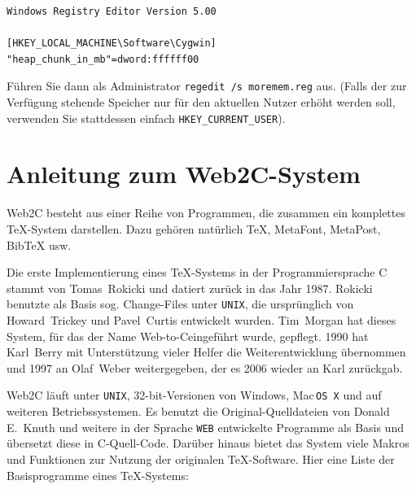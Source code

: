 \documentclass[12pt,ngerman,a4paper,fullparskip]{report}
\newcommand{\acro}[1]{\texttt{#1}}
\newcommand{\code}[1]{\texttt{#1}}
\def\MP{MetaPost}
\def\MF{MetaFont}
\def\BibTeX{Bib\TeX}
\providecommand*{\MacOSX}{Mac\,\acro{OS\,X}\xspace}
\begin{document}
\begin{verbatim}
Windows Registry Editor Version 5.00

[HKEY_LOCAL_MACHINE\Software\Cygwin]
"heap_chunk_in_mb"=dword:ffffff00
\end{verbatim}

Führen Sie dann als Administrator \code{regedit /s moremem.reg} aus.
(Falls der zur Verfügung stehende Speicher nur für den aktuellen Nutzer
erhöht werden soll, verwenden Sie stattdessen einfach \code{HKEY\_CURRENT\_USER}).

\chapter{Anleitung zum Web2C-System}

Web2C besteht aus einer Reihe von Programmen, die zusammen ein komplettes
\TeX-System darstellen. Dazu gehören natürlich \TeX, \MF, \MP, {\BibTeX} usw.

Die erste Implementierung eines \TeX-Systems in der Programmiersprache C stammt von Tomas~Rokicki und datiert zurück in das Jahr 1987. Rokicki benutzte als Basis sog. Change-Files unter \acro{UNIX}, die ursprünglich von Howard~Trickey und Pavel~Curtis entwickelt wurden. Tim~Morgan hat dieses System, für das der Name  Web-to-C\@ eingeführt wurde, gepflegt. 1990 hat Karl~Berry mit Unterstützung vieler Helfer die Weiterentwicklung übernommen und 1997 an Olaf~Weber weitergegeben, der es 2006 wieder an Karl zurückgab.

Web2C läuft unter \acro{UNIX}, 32-bit-Versionen von Windows, \MacOSX{}
und auf weiteren Betriebssystemen. Es benutzt die
Original-Quelldateien von Donald E.~Knuth und weitere in der
Sprache \texttt{WEB} entwickelte Programme als Basis und übersetzt diese
in C-Quell-Code. Darüber hinaus bietet das System viele Makros und
Funktionen zur Nutzung der originalen \TeX-Software. Hier eine
Liste der Basisprogramme eines \TeX-Systems:
\end{document}
